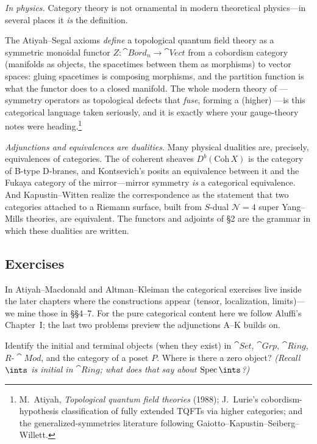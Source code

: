 \documentclass[11pt]{article}
\DeclareMathOperator{\Spec}{Spec}
\begin{document}
\emph{In physics.} Category theory is not ornamental in modern theoretical physics---in several
places it \emph{is} the definition.

\begin{iidea}
The Atiyah--Segal axioms \emph{define} a topological quantum field theory as a symmetric
monoidal functor $Z\colon\cat{Bord}_n\to\cat{Vect}$ from a cobordism category (manifolds as
objects, the spacetimes between them as morphisms) to vector spaces: gluing spacetimes is
composing morphisms, and the partition function is what the functor does to a closed manifold.
The whole modern theory of ---symmetry operators as topological
defects that \emph{fuse}, forming a (higher) ---is this categorical
language taken seriously, and it is exactly where your gauge-theory notes were
heading.\footnote{M.~Atiyah, \emph{Topological quantum field theories} (1988); J.~Lurie's
cobordism-hypothesis classification of fully extended TQFTs via higher categories; and the
generalized-symmetries literature following Gaiotto--Kapustin--Seiberg--Willett.}
\end{iidea}

\noindent
\emph{Adjunctions and equivalences are dualities.} Many physical dualities are, precisely,
equivalences of categories. The  of coherent sheaves
$D^b(\mathrm{Coh}\,X)$ is the category of B-type D-branes, and Kontsevich's  posits an equivalence between it and the Fukaya category of the mirror---mirror
symmetry \emph{is} a categorical equivalence. And Kapustin--Witten realize the  correspondence as the statement that two categories attached to a Riemann surface,
built from $S$-dual $\mathcal{N}=4$ super Yang--Mills theories, are equivalent. The functors and
adjoints of \S2 are the grammar in which these dualities are written.

\subsection{Exercises}

\noindent
In Atiyah--Macdonald and Altman--Kleiman the categorical exercises live inside the later
chapters where the constructions appear (tensor, localization, limits)---we mine those in
\S\S4--7. For the pure categorical content here we follow Aluffi's Chapter~I; the last two
problems preview the adjunctions A--K builds on.

\begin{xca}
Identify the initial and terminal objects (when they exist) in $\cat{Set}$, $\cat{Grp}$,
$\cat{Ring}$, $R\text{-}\cat{Mod}$, and the category of a poset $P$. Where is there a zero
object? \emph{(Recall $\ints$ is initial in $\cat{Ring}$; what does that say about
$\Spec\ints$?)}
\end{xca}
\end{document}
